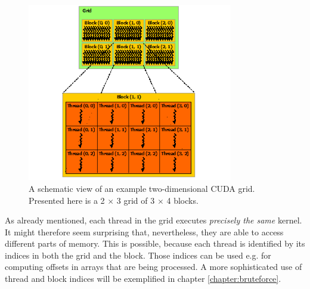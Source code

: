 \begin{figure}[ht]
    \centering
    \includegraphics[width=0.8\textwidth]{figures/grid-of-thread-blocks.png}
    \caption{{\protect {}} A schematic view of an example two-dimensional CUDA grid. Presented here is a 2 $\times$ 3 grid of 3 $\times$ 4 blocks.}
    \label{fig:cuda_grid}
\end{figure}

As already mentioned, each thread in the grid executes \emph{precisely the same} kernel. It might therefore seem surprising that, nevertheless, they are able to access different parts of memory. This is possible, because each thread is identified by its indices in both the grid and the block. Those indices can be used e.g. for computing offsets in arrays that are being processed. A more sophisticated use of thread and block indices will be exemplified in chapter \ref{chapter:bruteforce}.

